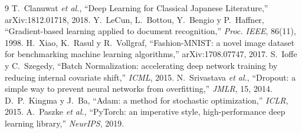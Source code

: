 \documentclass[11pt,letterpaper]{article}
\begin{document}
\begin{thebibliography}{9}
\small
{} T.~Clanuwat \textit{et al.}, ``Deep Learning for Classical Japanese Literature,'' arXiv:1812.01718, 2018.
 Y.~LeCun, L.~Bottou, Y.~Bengio y P.~Haffner, ``Gradient-based learning applied to document recognition,'' \textit{Proc. IEEE}, 86(11), 1998.
 H.~Xiao, K.~Rasul y R.~Vollgraf, ``Fashion-MNIST: a novel image dataset for benchmarking machine learning algorithms,'' arXiv:1708.07747, 2017.
 S.~Ioffe y C.~Szegedy, ``Batch Normalization: accelerating deep network training by reducing internal covariate shift,'' \textit{ICML}, 2015.
 N.~Srivastava \textit{et al.}, ``Dropout: a simple way to prevent neural networks from overfitting,'' \textit{JMLR}, 15, 2014.
 D.~P.~Kingma y J.~Ba, ``Adam: a method for stochastic optimization,'' \textit{ICLR}, 2015.
 A.~Paszke \textit{et al.}, ``PyTorch: an imperative style, high-performance deep learning library,'' \textit{NeurIPS}, 2019.
\end{thebibliography}
\end{document}
